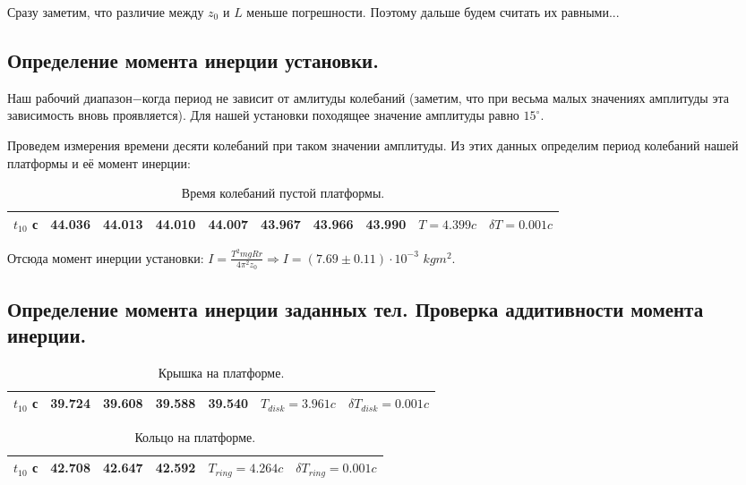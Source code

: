 \documentclass[12pt,a4paper]{article}
\begin{document}
Сразу заметим, что различие между $z_{0}$ и $L$ меньше погрешности.	Поэтому дальше будем считать их равными...	
		
		
		\subsection{Определение момента инерции установки.}
 Наш рабочий диапазон$-$когда период не зависит от амлитуды колебаний (заметим, что при весьма малых значениях амплитуды эта зависимость вновь проявляется). Для нашей установки походящее значение амплитуды равно $15^{\circ}$.
\par Проведем измерения времени десяти колебаний при таком значении амплитуды. Из этих данных определим период колебаний нашей платформы и её момент инерции:

\begin{table}[ht!]
	\begin{center}
	\begin{tabular}{|c|c|c|c|c|c|c|c||c|c|}
		\hline
		$t_{10}$ с & 44.036 & 44.013 & 44.010 & 44.007 & 43.967 & 43.966 &  43.990 & $T = 4.399c$ &$\delta T = 0.001c$\\
		\hline
	\end{tabular}
    \caption{Время колебаний пустой платформы.}
	\end{center}
	\end{table}
Отсюда момент инерции установки: $I=\frac{T^2mgRr}{4\pi^2z_{0}}\Rightarrow I=(7.69\pm 0.11)\cdot10^{-3}$ $kgm^{2}$.
	
	
	
	
	
	  \subsection{Определение момента инерции заданных тел. Проверка аддитивности момента инерции.}

          \begin{table}[ht!]
	\begin{center}
	\begin{tabular}{|c|c|c|c|c||c|c|}
		\hline
		$t_{10}$ с & 39.724 & 39.608 & 39.588 & 39.540 & $T_{disk} = 3.961c$ &$\delta T_{disk} = 0.001c$\\
		\hline
	\end{tabular}
    \caption{Крышка на платформе.}
	\end{center}
	\end{table}

          \begin{table}[ht!]
	\begin{center}
	\begin{tabular}{|c|c|c|c||c|c|}
		\hline
		$t_{10}$ с & 42.708 & 42.647 & 42.592 & $T_{ring} = 4.264c$ &$\delta T_{ring} = 0.001c$\\
		\hline
	\end{tabular}
    \caption{Кольцо на платформе.}
	\end{center}
	\end{table}
\end{document}
